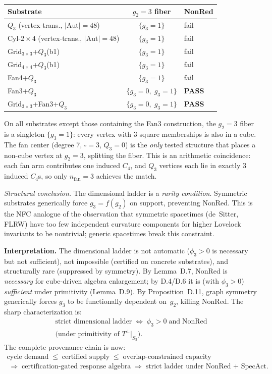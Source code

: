 \documentclass[11pt,a4paper]{article}
\theoremstyle{definition}
\theoremstyle{remark}
\begin{document}
\begin{center}\small
\begin{tabular}{lcl}
\toprule
\textbf{Substrate} & $g_2 = 3$ \textbf{fiber} & \textbf{NonRed} \\
\midrule
$Q_3$ (vertex-trans., $|\mathrm{Aut}| = 48$) & $\{g_3 = 1\}$ & fail \\
Cyl-$2{\times}4$ (vertex-trans., $|\mathrm{Aut}| = 48$) & $\{g_3 = 1\}$ & fail \\
Grid$_{3\times3}$+$Q_3$(b1) & $\{g_3 = 1\}$ & fail \\
Grid$_{4\times4}$+$Q_3$(b1) & $\{g_3 = 1\}$ & fail \\
Fan4+$Q_3$ & $\{g_3 = 1\}$ & fail \\
Fan3+$Q_3$ & $\{g_3 = 0,\; g_3 = 1\}$ & \textbf{PASS} \\
Grid$_{3\times3}$+Fan3+$Q_3$ & $\{g_3 = 0,\; g_3 = 1\}$ & \textbf{PASS} \\
\bottomrule
\end{tabular}
\end{center}

On all substrates except those containing the Fan3 construction, the $g_2 = 3$ fiber is a singleton $\{g_3 = 1\}$: every vertex with 3 square memberships is also in a cube. The fan center (degree 7, $\square = 3$, $Q_3 = 0$) is the \emph{only} tested structure that places a non-cube vertex at $g_2 = 3$, splitting the fiber. This is an arithmetic coincidence: each fan arm contributes one induced $C_4$, and $Q_3$ vertices each lie in exactly 3 induced $C_4$s, so only $n_{\mathrm{fan}} = 3$ achieves the match.

\emph{Structural conclusion.} The dimensional ladder is a \emph{rarity condition}. Symmetric substrates generically force $g_3 = f(g_2)$ on support, preventing NonRed. This is the NFC analogue of the observation that symmetric spacetimes (de~Sitter, FLRW) have too few independent curvature components for higher Lovelock invariants to be nontrivial; generic spacetimes break this constraint.

\textbf{Interpretation.} The dimensional ladder is not automatic ($\phi_3 > 0$ is necessary but not sufficient), not impossible (certified on concrete substrates), and structurally rare (suppressed by symmetry). By Lemma~D.7, NonRed is \emph{necessary} for cube-driven algebra enlargement; by D.4/D.6 it is (with $\phi_3 > 0$) \emph{sufficient} under primitivity (Lemma~D.9). By Proposition~D.11, graph symmetry generically forces $g_3$ to be functionally dependent on~$g_2$, killing NonRed. The sharp characterization is:
\begin{multline*}
\text{strict dimensional ladder} \;\iff\; \phi_3 > 0 \;\text{and}\; \mathrm{NonRed} \\
\text{(under primitivity of } T^\perp|_{S_3}\text{)}.
\end{multline*}
The complete provenance chain is now:
\begin{multline*}
\text{cycle demand} \;\leq\; \text{certified supply} \;\leq\; \text{overlap-constrained capacity} \\
\;\Rightarrow\; \text{certification-gated response algebra} \;\Rightarrow\; \text{strict ladder under NonRed + SpecAct}.
\end{multline*}
\end{document}
